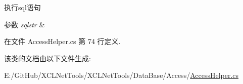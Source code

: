 执行sql语句 


\begin{DoxyParams}{参数}
{\em sqlstr} & \\
\hline
\end{DoxyParams}


在文件 Access\+Helper.\+cs 第 74 行定义.



该类的文档由以下文件生成\+:\begin{DoxyCompactItemize}
\item 
E\+:/\+Git\+Hub/\+X\+C\+L\+Net\+Tools/\+X\+C\+L\+Net\+Tools/\+Data\+Base/\+Access/\hyperlink{_access_helper_8cs}{Access\+Helper.\+cs}\end{DoxyCompactItemize}
